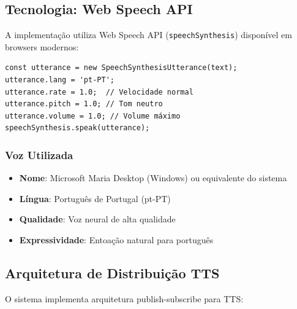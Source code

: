 \subsection{Tecnologia: Web Speech API}

A implementação utiliza Web Speech API (\texttt{speechSynthesis}) disponível em browsers modernos:

\begin{verbatim}
const utterance = new SpeechSynthesisUtterance(text);
utterance.lang = 'pt-PT';
utterance.rate = 1.0;  // Velocidade normal
utterance.pitch = 1.0; // Tom neutro
utterance.volume = 1.0; // Volume máximo
speechSynthesis.speak(utterance);
\end{verbatim}

\subsubsection{Voz Utilizada}

\begin{itemize}
    \item \textbf{Nome}: Microsoft Maria Desktop (Windows) ou equivalente do sistema
    \item \textbf{Língua}: Português de Portugal (pt-PT)
    \item \textbf{Qualidade}: Voz neural de alta qualidade
    \item \textbf{Expressividade}: Entoação natural para português
\end{itemize}

\subsection{Arquitetura de Distribuição TTS}

O sistema implementa arquitetura publish-subscribe para TTS:

